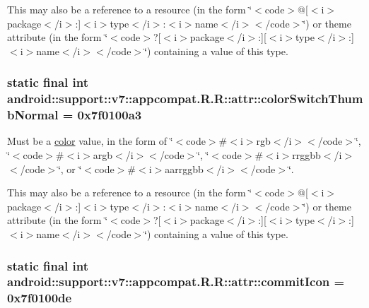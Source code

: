 This may also be a reference to a resource (in the form \char`\"{}$<$code$>$@\mbox{[}$<$i$>$package$<$/i$>$:\mbox{]}$<$i$>$type$<$/i$>$:$<$i$>$name$<$/i$>$$<$/code$>$\char`\"{}) or theme attribute (in the form \char`\"{}$<$code$>$?\mbox{[}$<$i$>$package$<$/i$>$:\mbox{]}\mbox{[}$<$i$>$type$<$/i$>$:\mbox{]}$<$i$>$name$<$/i$>$$<$/code$>$\char`\"{}) containing a value of this type. \hypertarget{classandroid_1_1support_1_1v7_1_1appcompat_1_1_r_1_1attr_bb317034e010a342de067aea45c520e8}{
\subsubsection[{colorSwitchThumbNormal}]{\setlength{\rightskip}{0pt plus 5cm}static final int android::support::v7::appcompat.R.R::attr::colorSwitchThumbNormal = 0x7f0100a3}}
\label{classandroid_1_1support_1_1v7_1_1appcompat_1_1_r_1_1attr_bb317034e010a342de067aea45c520e8}


Must be a \hyperlink{classandroid_1_1support_1_1v7_1_1appcompat_1_1_r_1_1color}{color} value, in the form of \char`\"{}$<$code$>$\#$<$i$>$rgb$<$/i$>$$<$/code$>$\char`\"{}, \char`\"{}$<$code$>$\#$<$i$>$argb$<$/i$>$$<$/code$>$\char`\"{}, \char`\"{}$<$code$>$\#$<$i$>$rrggbb$<$/i$>$$<$/code$>$\char`\"{}, or \char`\"{}$<$code$>$\#$<$i$>$aarrggbb$<$/i$>$$<$/code$>$\char`\"{}. 

This may also be a reference to a resource (in the form \char`\"{}$<$code$>$@\mbox{[}$<$i$>$package$<$/i$>$:\mbox{]}$<$i$>$type$<$/i$>$:$<$i$>$name$<$/i$>$$<$/code$>$\char`\"{}) or theme attribute (in the form \char`\"{}$<$code$>$?\mbox{[}$<$i$>$package$<$/i$>$:\mbox{]}\mbox{[}$<$i$>$type$<$/i$>$:\mbox{]}$<$i$>$name$<$/i$>$$<$/code$>$\char`\"{}) containing a value of this type. \hypertarget{classandroid_1_1support_1_1v7_1_1appcompat_1_1_r_1_1attr_9c7dd34c644affe3a22ae9cb654354c5}{
\subsubsection[{commitIcon}]{\setlength{\rightskip}{0pt plus 5cm}static final int android::support::v7::appcompat.R.R::attr::commitIcon = 0x7f0100de}}
\label{classandroid_1_1support_1_1v7_1_1appcompat_1_1_r_1_1attr_9c7dd34c644affe3a22ae9cb654354c5}


